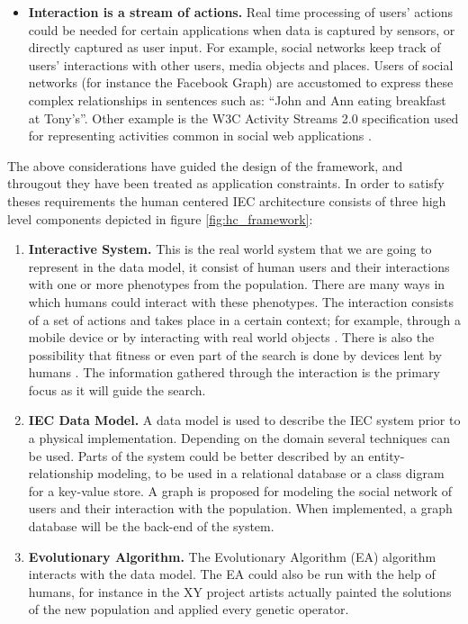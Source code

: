 \begin{itemize}
\item {\bf Interaction is a stream of actions.}
  Real time processing of users' actions could be needed for certain applications when data is 
  captured by sensors, or directly captured as user input. For example, social networks keep
  track of users' interactions with other users, media objects and places. Users of 
  social networks (for instance the Facebook Graph) are accustomed to express these 
  complex relationships in sentences such as: ``John and Ann eating breakfast at Tony's''. 
  Other example is the W3C Activity Streams 2.0 specification used for representing activities 
  common in social web applications \cite{json:streams}. 
\end{itemize}

The above considerations have guided the design of the framework, and througout they have been
treated as application constraints. In order to satisfy theses requirements the
human centered IEC architecture consists of three high level components depicted
in figure \ref{fig:hc_framework}:

\begin{enumerate}
  \item {\bf Interactive System.} 
  This is the real world system that we are going to represent in the data model, 
  it consist of human users and their interactions with one or more phenotypes
  from the population. There are many ways in which humans could interact 
  with these phenotypes. The interaction consists of a set of actions and 
  takes place in a certain context; for example, through a mobile device  
  or by interacting with real world objects 
  \cite{de2014artists,de2013unplugging}. 
  There is also the possibility that fitness or even part of the search 
  is done by devices lent by humans \cite{DBLP:conf/gecco/MereloCGCRV16}.
  The information gathered through the interaction is the primary focus
  as it will guide the search. 

  \item {\bf IEC Data Model.}
  A data model is used to describe the IEC system prior to a physical 
  implementation.  Depending on the domain several techniques can be used.
  Parts of the system could be better described by an entity-relationship 
  modeling, to be used in a relational database or a class digram for a 
  key-value store. A graph is proposed for modeling the social network of users 
  and their interaction with the population. When implemented, a graph database 
  will be the back-end of the system. 

  \item {\bf Evolutionary Algorithm.} 
  The Evolutionary Algorithm (EA) algorithm interacts with the data model. The EA could also be run with the help of
  humans, for instance in the XY project \cite{de2013unplugging} artists actually painted
  the solutions of the new population and applied every genetic operator.
\end{enumerate}

